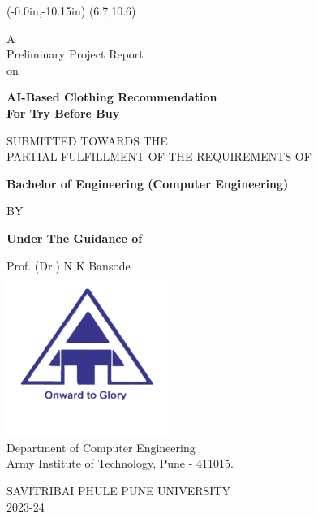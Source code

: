 \thisfancyput(-0.0in,-10.15in){
	\setlength{\unitlength}{1in}
	\framebox(6.7,10.6)
}
\setlength{\parindent}{0mm}
\begin{center}
	A \\ Preliminary Project Report \\ on

	\vspace*{1\baselineskip}

	{
		\bfseries \Large
		AI-Based Clothing Recommendation \\ For Try Before Buy \\
		\vspace*{1.5\baselineskip}
	}

	SUBMITTED TOWARDS THE \\
	PARTIAL FULFILLMENT OF THE REQUIREMENTS OF \\
	
	\vspace*{1.5\baselineskip}

	{
		\bfseries \large
		Bachelor of Engineering (Computer Engineering) \\
		\vspace*{1\baselineskip}

		BY \\
		\vspace*{1\baselineskip}
	}

	\nametable

	\vspace*{0.5\baselineskip}

	{
		\bfseries \large
		Under The Guidance of \\  
		\vspace*{0.5\baselineskip}
	}

	Prof. (Dr.) N K Bansode\\[1cm]

	\includegraphics[scale=0.75]{components/images/logo.png} \\[0.5cm]
	
	Department of Computer Engineering \\
	Army Institute of Technology, Pune - 411015.\\
	\vspace*{0.5\baselineskip}

	SAVITRIBAI PHULE PUNE UNIVERSITY \\
	2023-24
\end{center}

\pagebreak